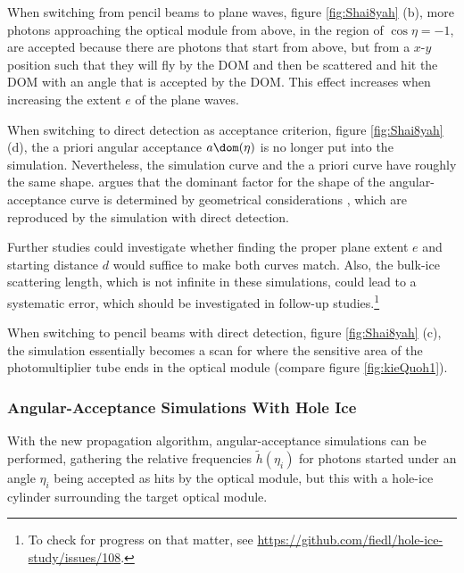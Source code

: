 When switching from pencil beams to plane waves, figure \ref{fig:Shai8yah} (b), more photons approaching the optical module from above, in the region of $\cos \eta = -1$, are accepted because there are photons that start from above, but from a $x$-$y$ position such that they will fly by the DOM and then be scattered and hit the DOM with an angle that is accepted by the DOM. This effect increases when increasing the extent $e$ of the plane waves.


When switching to direct detection as acceptance criterion, figure \ref{fig:Shai8yah} (d), the a priori angular acceptance $a\dom(\eta)$ is no longer put into the simulation. Nevertheless, the simulation curve and the a priori curve have roughly the same shape. \rongen argues that the dominant factor for the shape of the angular-acceptance curve is determined by geometrical considerations \cite{martindardupdate}, which are reproduced by the simulation with direct detection.

Further studies could investigate whether finding the proper plane extent $e$ and starting distance $d$ would suffice to make both curves match. Also, the bulk-ice scattering length, which is not infinite in these simulations, could lead to a systematic error, which should be investigated in follow-up studies.\footnote{To check for progress on that matter, see \url{https://github.com/fiedl/hole-ice-study/issues/108}.}\followup

When switching to pencil beams with direct detection, figure \ref{fig:Shai8yah} (c), the simulation essentially becomes a scan for where the sensitive area of the photomultiplier tube ends in the optical module (compare figure \ref{fig:kieQuoh1}).


\subsubsection{Angular-Acceptance Simulations With Hole Ice}
\label{sec:angular_acceptance_simulations_with_hole_ice}\label{sec:hole_ice_approximation}
With the new propagation algorithm, angular-acceptance simulations can be performed, gathering the relative frequencies $\tilde{h}(\eta_i)$ for photons started under an angle $\eta_i$ being accepted as hits by the optical module, but this with a hole-ice cylinder surrounding the target optical module.


